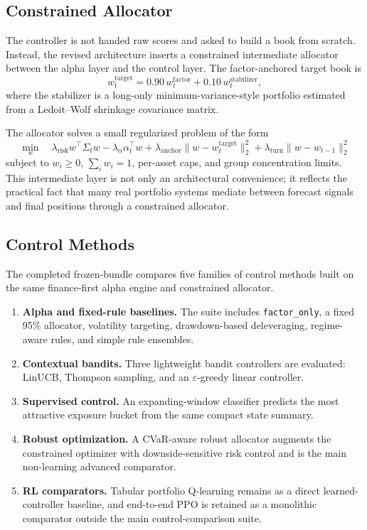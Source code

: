 \documentclass[10pt,twocolumn]{article}
\begin{document}
\subsection{Constrained Allocator}

The controller is not handed raw scores and asked to build a book from scratch.
Instead, the revised architecture inserts a constrained intermediate allocator
between the alpha layer and the control layer. The factor-anchored target book
is
\[
w_t^{\text{target}} =
0.90\,w_t^{\text{factor}} +
0.10\,w_t^{\text{stabilizer}},
\]
where the stabilizer is a long-only minimum-variance-style portfolio estimated
from a Ledoit--Wolf shrinkage covariance matrix.

The allocator solves a small regularized problem of the form
\[
\min_w \quad
\lambda_{\mathrm{risk}} w^\top \Sigma_t w
- \lambda_{\alpha}\alpha_t^\top w
+ \lambda_{\mathrm{anchor}}\lVert w - w_t^{\mathrm{target}} \rVert_2^2
+ \lambda_{\mathrm{turn}}\lVert w - w_{t-1} \rVert_2^2
\]
subject to $w_i \ge 0$, $\sum_i w_i = 1$, per-asset caps, and group
concentration limits. This intermediate layer is not only an architectural
convenience; it reflects the practical fact that many real portfolio systems
mediate between forecast signals and final positions through a constrained
allocator.

\subsection{Control Methods}

The completed frozen-bundle compares five families of control methods built on
the same finance-first alpha engine and constrained allocator.
\begin{enumerate}[leftmargin=1.5em, itemsep=2pt, topsep=4pt]
\item \textbf{Alpha and fixed-rule baselines.} The suite includes
      \texttt{factor\_only}, a fixed 95\% allocator, volatility targeting,
      drawdown-based deleveraging, regime-aware rules, and simple rule
      ensembles.
\item \textbf{Contextual bandits.} Three lightweight bandit controllers are
      evaluated: LinUCB, Thompson sampling, and an $\varepsilon$-greedy linear
      controller.
\item \textbf{Supervised control.} An expanding-window classifier predicts the
      most attractive exposure bucket from the same compact state summary.
\item \textbf{Robust optimization.} A CVaR-aware robust allocator augments the
      constrained optimizer with downside-sensitive risk control and is the
      main non-learning advanced comparator.
\item \textbf{RL comparators.} Tabular portfolio Q-learning remains as a direct
      learned-controller baseline, and end-to-end PPO is retained as a
      monolithic comparator outside the main control-comparison suite.
\end{enumerate}
\end{document}
